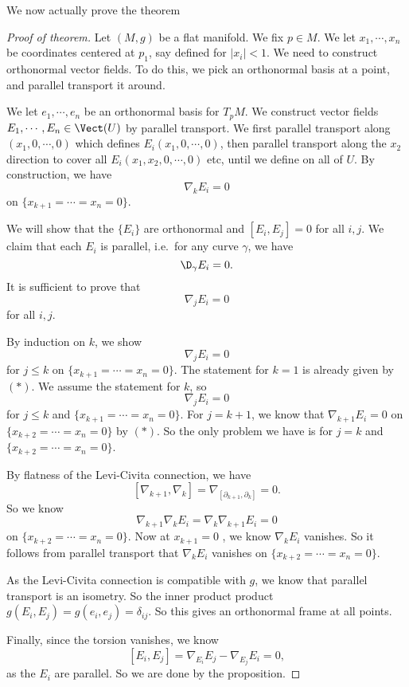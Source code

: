 \documentclass[a4paper]{article}
\begin{document}
We now actually prove the theorem
\begin{proof}[Proof of theorem]
  Let $(M, g)$ be a flat manifold. We fix $p \in M$. We let $x_1, \cdots, x_n$ be coordinates centered at $p_1$, say defined for $|x_i| < 1$. We need to construct orthonormal vector fields. To do this, we pick an orthonormal basis at a point, and parallel transport it around.

  We let $e_1, \cdots, e_n$ be an orthonormal basis for $T_p M$. We construct vector fields $E_1, \cdots, E_n \in \Vect(U)$ by parallel transport. We first parallel transport along $(x_1, 0, \cdots, 0)$ which defines $E_i(x_1, 0, \cdots, 0)$, then parallel transport along the $x_2$ direction to cover all $E_i(x_1, x_2, 0, \cdots, 0)$ etc, until we define on all of $U$. By construction, we have
  \[
    \nabla_k E_i = 0\tag{$*$}
  \]
  on $\{x_{k + 1} = \cdots = x_n = 0\}$.

  We will show that the $\{E_i\}$ are orthonormal and $[E_i, E_j] = 0$ for all $i, j$. We claim that each $E_i$ is parallel, i.e.\ for any curve $\gamma$, we have
  \[
    \D_\gamma E_i = 0.
  \]
  It is sufficient to prove that
  \[
    \nabla_{j} E_i = 0
  \]
  for all $i, j$.

  By induction on $k$, we show
  \[
    \nabla_{j} E_i = 0
  \]
  for $j \leq k$ on $\{x_{k + 1} = \cdots = x_n = 0\}$. The statement for $k = 1$ is already given by $(*)$. We assume the statement for $k$, so
  \[
    \nabla_j E_i = 0\tag{$A$}
  \]
  for $j \leq k$ and $\{x_{k + 1} = \cdots = x_n = 0\}$. For $j = k + 1$, we know that $\nabla_{k + 1} E_i = 0$ on $\{x_{k + 2} = \cdots = x_n = 0\}$ by $(*)$. So the only problem we have is for $j = k$ and $\{x_{k + 2} = \cdots = x_n = 0\}$.

  By flatness of the Levi-Civita connection, we have
  \[
    \left[\nabla_{k + 1}, \nabla_k\right] = \nabla_{[\partial_{k + 1}, \partial_k]} = 0.
  \]
  So we know
  \[
    \nabla_{k + 1} \nabla_k E_i = \nabla_k \nabla_{k + 1} E_i = 0\tag{$B$}
  \]
  on $\{x_{k + 2} = \cdots = x_n = 0\}$. Now at $x_{k + 1} = 0$ , we know $\nabla_k E_i$ vanishes. So it follows from parallel transport that $\nabla_k E_i$ vanishes on $\{x_{k + 2} = \cdots = x_n = 0\}$.

  As the Levi-Civita connection is compatible with $g$, we know that parallel transport is an isometry. So the inner product product $g(E_i, E_j) = g(e_i, e_j) = \delta_{ij}$. So this gives an orthonormal frame at all points.

  Finally, since the torsion vanishes, we know
  \[
    [E_i, E_j] = \nabla_{E_i} E_j - \nabla_{E_j} E_i = 0,
  \]
  as the $E_i$ are parallel. So we are done by the proposition.
\end{proof}
\end{document}
